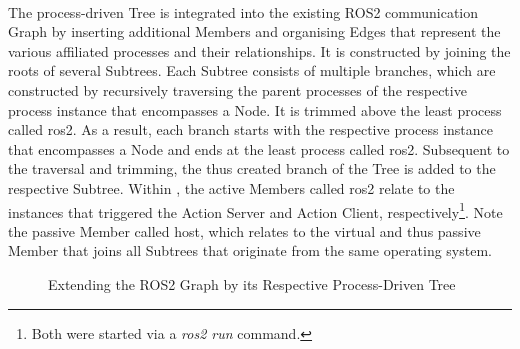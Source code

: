 \begin{description}[leftmargin=\descriptionIndent, itemsep=-0.2em]
        \item[5) Integrating the Process-Driven Tree] \hfill \\
        The process-driven Tree is integrated into the existing ROS2 communication Graph by inserting additional Members and organising Edges that represent the various affiliated processes and their relationships. It is constructed by joining the roots of several Subtrees. Each Subtree consists of multiple branches, which are constructed by recursively traversing the parent processes of the respective process instance that encompasses a Node. It is trimmed above the least process called \glqq{}ros2\grqq{}. As a result, each branch starts with the respective process instance that encompasses a Node and ends at the least process called \glqq{}ros2\grqq{}. Subsequent to the traversal and trimming, the thus created branch of the Tree is added to the respective Subtree. Within , the active Members called \glqq{}ros2\grqq{} relate to the instances that triggered the Action Server and Action Client, respectively\footnote{Both were started via a \emph{ros2 run} command.}. Note the passive Member called \glqq{}host\grqq{}, which relates to the virtual and thus passive Member that joins all Subtrees that originate from the same operating system.
        \begin{figure}[h]
            \centering
            
            \caption[Extending the ROS2 Graph by its Respective Process-Driven Tree]{Extending the ROS2 Graph by its Respective Process-Driven Tree \circledLegend} \label{fig:neo4j:exemplarygraph:processdrivenTree}
        \end{figure}


\end{description}
